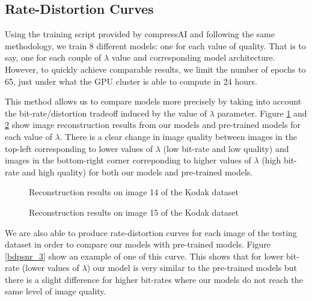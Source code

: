 \subsection{Rate-Distortion Curves}
Using the training script provided by compressAI and following the same methodology, we train 8 different models: one for each value of \textsf{quality}. That is to say, one for each couple of \(\lambda\) value and corresponding model architecture. However, to quickly achieve comparable results, we limit the number of epochs to 65, just under what the GPU cluster is able to compute in 24 hours.

This method allows us to compare models more precisely by taking into account the bit-rate/distortion tradeoff induced by the value of \(\lambda\) parameter. Figure \ref{bdpsnr_1} and \ref{bdpsnr_2} show image reconstruction results from our models and pre-trained models for each value of \(\lambda\). There is a clear change in image quality between images in the top-left corresponding to lower values of \(\lambda\) (low bit-rate and low quality) and images in the bottom-right corner correponding to higher values of \(\lambda\) (high bit-rate and high quality) for both our models and pre-trained models.

\begin{figure}[H]
    \centering
    \caption{Reconstruction results on image 14 of the Kodak dataset}
    \label{bdpsnr_1}
\end{figure}

\begin{figure}[H]
    \centering
    \caption{Reconstruction results on image 15 of the Kodak dataset}
    \label{bdpsnr_2}
\end{figure}

We are also able to produce rate-distortion curves for each image of the testing dataset in order to compare our models with pre-trained models. Figure \ref{bdpsnr_3} show an example of one of this curve. This shows that for lower bit-rate (lower values of \(\lambda\)) our model is very similar to the pre-trained models but there is a slight difference for higher bit-rates where our models do not reach the same level of image quality.

